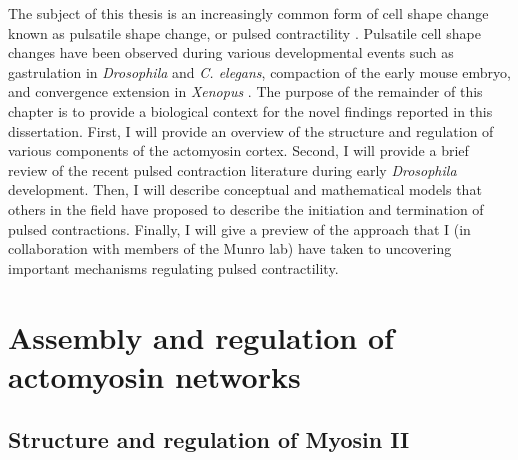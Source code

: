\documentclass{ucetd}
\begin{document}
The subject of this thesis is an increasingly common form of cell shape change known as pulsatile shape change, or pulsed contractility \cite{Munro:2004jk,Martin:2009du,Gorfinkiel:2016bv}.  Pulsatile cell shape changes have been observed during various developmental events such as gastrulation in \textit{Drosophila} and \textit{C. elegans}, compaction of the early mouse embryo, and convergence extension in \textit{Xenopus} \cite{Martin:2009du, RohJohnson:2012cf,Maitre:2015hc}.  The purpose of the remainder of this chapter is to provide a biological context for the novel findings reported in this dissertation.  First, I will provide an overview of the structure and regulation of various components of the actomyosin cortex.  Second, I will provide a brief review of the recent pulsed contraction literature during early \textit{Drosophila} development.  Then, I will describe conceptual and mathematical models that others in the field have proposed to describe the initiation and termination of pulsed contractions.  Finally, I will give a preview of the approach that I (in collaboration with members of the Munro lab) have taken to uncovering important mechanisms regulating pulsed contractility.



\section{Assembly and regulation of actomyosin networks}

\subsection{Structure and regulation of Myosin II}
\end{document}

